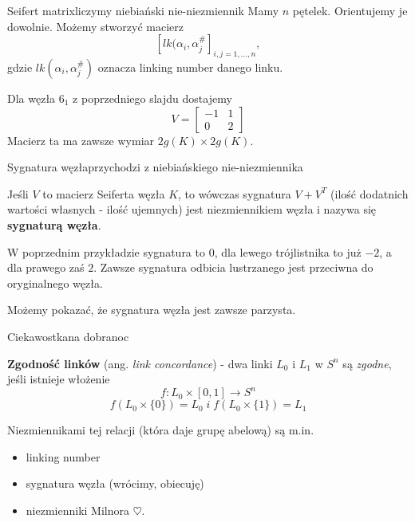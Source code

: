 \documentclass{beamer}
\begin{document}
\begin{frame}{Seifert matrix}{liczymy niebiański nie-niezmiennik}
  Mamy $n$ pętelek. Orientujemy je dowolnie. Możemy stworzyć macierz
  $$\left[ lk(\alpha_i, \alpha_j^{\#} \right]_{i,j=1,...,n},$$
  gdzie $lk(\alpha_i, \alpha_j^{\#})$ oznacza linking number danego linku.
  \medskip 

  Dla węzła $6_1$ z poprzedniego slajdu dostajemy
  $$
  V=\begin{bmatrix}
    -1 & 1\\ 
    0 & 2 
  \end{bmatrix}
  $$
  Macierz ta ma zawsze wymiar $2g(K)\times 2g(K)$.
\end{frame}

\begin{frame}{Sygnatura węzła}{przychodzi z niebiańskiego nie-niezmiennika}
  \begin{definition}
    Jeśli $V$ to macierz Seiferta węzła $K$, to wówczas sygnatura $V+V^T$ (ilość dodatnich wartości własnych - ilość ujemnych) jest niezmiennikiem węzła i nazywa się \textbf{\color{orange}sygnaturą węzła}.
  \end{definition}

  W poprzednim przykładzie sygnatura to $0$, dla lewego trójlistnika to już $-2$, a dla prawego zaś $2$. Zawsze sygnatura odbicia lustrzanego jest przeciwna do oryginalnego węzła.
  \bigskip 

  Możemy pokazać, że sygnatura węzła jest zawsze parzysta.
\end{frame}


\begin{frame}{Ciekawostka}{na dobranoc}
  \begin{definition}
    \textbf{\color{green}Zgodność linków} (ang. \emph{link concordance}) - dwa linki $L_0$ i $L_1$ w $S^n$ są \emph{\color{blue}zgodne}, jeśli istnieje włożenie
    $$f:L_0\times[0, 1]\to S^n$$
    $$f(L_0\times\{0\})=L_0\;i\;f(L_0\times\{1\})=L_1$$
  \end{definition}
  Niezmiennikami tej relacji (która daje grupę abelową) są m.in.
  \begin{itemize}
    \item linking number
    \item sygnatura węzła (wrócimy, obiecuję)
    \item niezmienniki Milnora $\heartsuit$.
  \end{itemize}
\end{frame}
\end{document}
